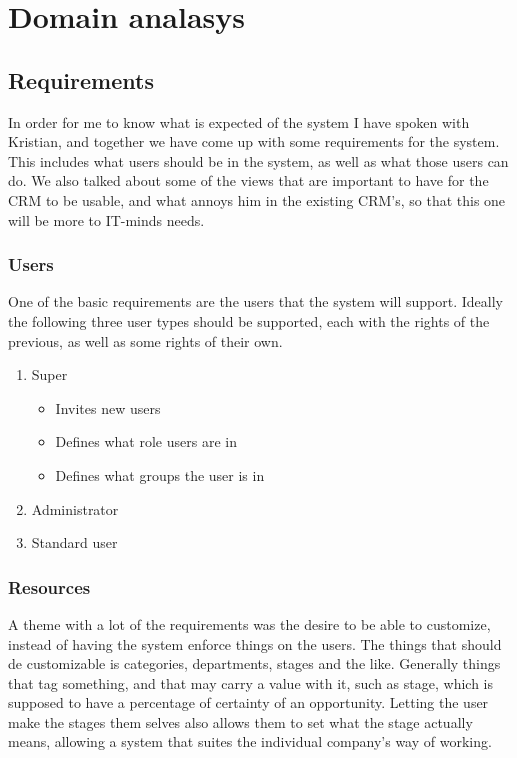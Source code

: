\chapter{Domain analasys}
\label{chap:Domain analasys}

\section{Requirements}
\label{sec:Requirements}
In order for me to know what is expected of the system I have spoken with Kristian, and together we have come up with some requirements for the system. This includes what users should be in the system, as well as what those users can do. We also talked about some of the views that are important to have for the CRM to be usable, and what annoys him in the existing CRM's, so that this one will be more to IT-minds needs.

\subsection{Users}
\label{sub:Users}

One of the basic requirements are the users that the system will support. Ideally the following three user types should be supported, each with the rights of the previous, as well as some rights of their own.

\begin{enumerate}
  \item Super
  \begin{itemize}
    \item Invites new users
    \item Defines what role users are in
    \item Defines what groups the user is in
  \end{itemize}
  \item Administrator
  \item Standard user
\end{enumerate}


\subsection{Resources}
\label{sub:Resources}

A theme with a lot of the requirements was the desire to be able to customize, instead of having the system enforce things on the users. The things that should de customizable is categories, departments, stages and the like. Generally things that tag something, and that may carry a value with it, such as stage, which is supposed to have a percentage of certainty of an opportunity. Letting the user make the stages them selves also allows them to set what the stage actually means, allowing a system that suites the individual company's way of working.

